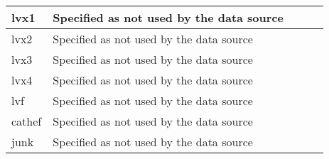 \documentclass[a4paper,12pt]{article}
\begin{document}
\begin{adjustbox}{width=1\textwidth}
\begin{tabular}{|l|l|l|l|l|}
lvx1          & Specified as not used by the data source                       &               &                                                                                                                                                                                                                                                                &                     \\ \hline
lvx2          & Specified as not used by the data source                       &               &                                                                                                                                                                                                                                                                &                     \\ \hline
lvx3          & Specified as not used by the data source                       &               &                                                                                                                                                                                                                                                                &                     \\ \hline
lvx4          & Specified as not used by the data source                       &               &                                                                                                                                                                                                                                                                &                     \\ \hline
lvf           & Specified as not used by the data source                       &               &                                                                                                                                                                                                                                                                &                     \\ \hline
cathef        & Specified as not used by the data source                       &               &                                                                                                                                                                                                                                                                &                     \\ \hline
junk          & Specified as not used by the data source                       &               &                                                                                                                                                                                                                                                                &                     \\ \hline

\end{tabular}
\end{adjustbox}
\end{document}
